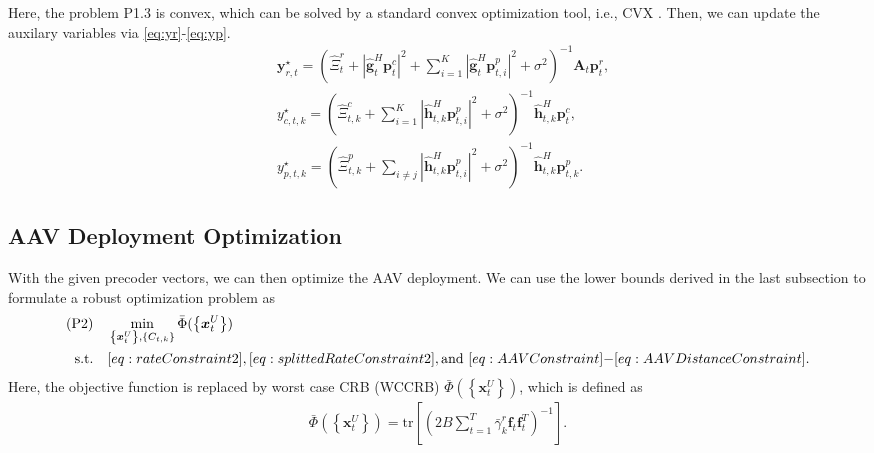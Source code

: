 \documentclass[twocolumn,journal]{IEEEtran}
\begin{document}
Here, the problem P1.3 is convex, which can be solved by a standard convex optimization tool, i.e., CVX \cite{cvx}. Then, we can update the auxilary variables via \eqref{eq:yr}-\eqref{eq:yp}. 
\begin{subequations}
\begin{align}
    &\boldsymbol{y}_{r,t}^{\star} = \left(\hat{\Xi}^{r}_{t} + \left| \hat{\boldsymbol{g}}^{H}_{t}\boldsymbol{p}^{c}_{t}\right|^2 + \sum_{i=1}^{K}\left| \hat{\boldsymbol{g}}^{H}_{t}\boldsymbol{p}^{p}_{t,i}\right|^2 + \sigma^2\right)^{-1}\mathbf{A}_t\boldsymbol{p}^{r}_{t},\label{eq:yr}\\
    &y_{c,t,k}^{\star} = \left( \hat{\Xi}^{c}_{t,k} +  \sum_{i=1}^{K}\left| \hat{\boldsymbol{h}}^{H}_{t,k}\boldsymbol{p}^{p}_{t,i}\right|^2 + \sigma^2 \right)^{-1}\hat{\boldsymbol{h}}^{H}_{t,k}\boldsymbol{p}^{c}_{t},\label{eq:yc}\\
    &y_{p,t,k}^{\star} = \left( \hat{\Xi}^{p}_{t,k} +  \sum_{i\neq j}\left| \hat{\boldsymbol{h}}^{H}_{t,k}\boldsymbol{p}^{p}_{t,i}\right|^2 + \sigma^2 \right)^{-1}\hat{\boldsymbol{h}}^{H}_{t,k}\boldsymbol{p}^{p}_{t,k}.\label{eq:yp}
\end{align}
\end{subequations}
\subsection{AAV Deployment Optimization}
With the given precoder vectors, we can then optimize the AAV deployment. We can use the lower bounds derived in the last subsection to formulate a robust optimization problem as 
\begin{align}
 (\text{P2})\quad&\min_{\left\{\boldsymbol{x}^{U}_{t}\right\},\left\{C_{t,k}\right\}} \bar{{\Phi}}(\left\{\boldsymbol{x}^{U}_{t}\right\})\label{eq:objP2}\\
 \text{s.t.}\quad& \eqref{eq:rateConstraint2}, \eqref{eq:splittedRateConstraint2}, \text{and } \eqref{eq:AAVConstraint}\mbox{-}\eqref{eq:AAVDistanceConstraint}.\notag
\end{align}
Here, the objective function is replaced by worst case CRB (WCCRB) \(\bar{{\Phi}}(\left\{\boldsymbol{x}^{U}_{t}\right\})\), which is defined as
\begin{align}
 \bar{{\Phi}}(\left\{\boldsymbol{x}^{U}_{t}\right\}) = \text{tr}\left[\left(2B\sum_{t=1}^{T} \bar{\gamma}_{k}^{r}\boldsymbol{f}_{t}\boldsymbol{f}^{T}_{t}\right)^{-1}\right].
\end{align}
\end{document}
